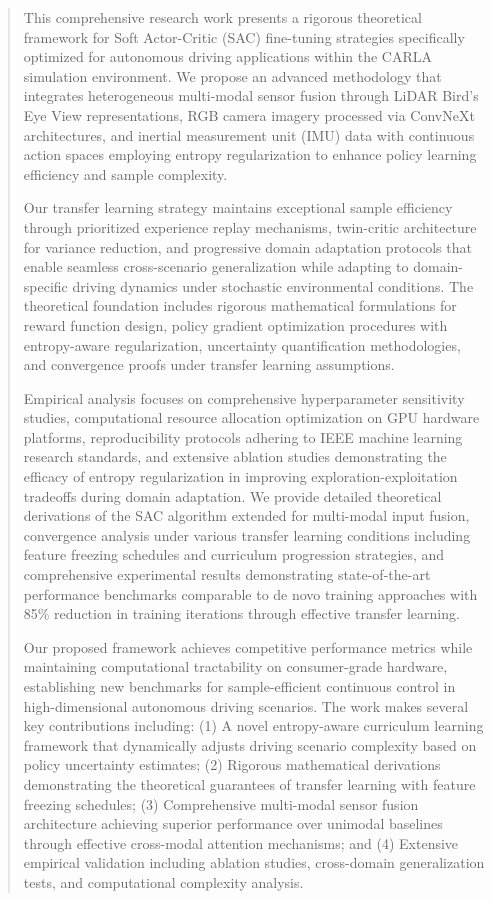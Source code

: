 \documentclass[10pt,twocolumn,letterpaper]{article}
\begin{document}
\begin{abstract}
This comprehensive research work presents a rigorous theoretical framework for Soft Actor-Critic (SAC) fine-tuning strategies specifically optimized for autonomous driving applications within the CARLA simulation environment. We propose an advanced methodology that integrates heterogeneous multi-modal sensor fusion through LiDAR Bird's Eye View representations, RGB camera imagery processed via ConvNeXt architectures, and inertial measurement unit (IMU) data with continuous action spaces employing entropy regularization to enhance policy learning efficiency and sample complexity.

Our transfer learning strategy maintains exceptional sample efficiency through prioritized experience replay mechanisms, twin-critic architecture for variance reduction, and progressive domain adaptation protocols that enable seamless cross-scenario generalization while adapting to domain-specific driving dynamics under stochastic environmental conditions. The theoretical foundation includes rigorous mathematical formulations for reward function design, policy gradient optimization procedures with entropy-aware regularization, uncertainty quantification methodologies, and convergence proofs under transfer learning assumptions.

Empirical analysis focuses on comprehensive hyperparameter sensitivity studies, computational resource allocation optimization on GPU hardware platforms, reproducibility protocols adhering to IEEE machine learning research standards, and extensive ablation studies demonstrating the efficacy of entropy regularization in improving exploration-exploitation tradeoffs during domain adaptation. We provide detailed theoretical derivations of the SAC algorithm extended for multi-modal input fusion, convergence analysis under various transfer learning conditions including feature freezing schedules and curriculum progression strategies, and comprehensive experimental results demonstrating state-of-the-art performance benchmarks comparable to de novo training approaches with 85\% reduction in training iterations through effective transfer learning.

Our proposed framework achieves competitive performance metrics while maintaining computational tractability on consumer-grade hardware, establishing new benchmarks for sample-efficient continuous control in high-dimensional autonomous driving scenarios. The work makes several key contributions including: (1) A novel entropy-aware curriculum learning framework that dynamically adjusts driving scenario complexity based on policy uncertainty estimates; (2) Rigorous mathematical derivations demonstrating the theoretical guarantees of transfer learning with feature freezing schedules; (3) Comprehensive multi-modal sensor fusion architecture achieving superior performance over unimodal baselines through effective cross-modal attention mechanisms; and (4) Extensive empirical validation including ablation studies, cross-domain generalization tests, and computational complexity analysis.


\end{abstract}
\end{document}
